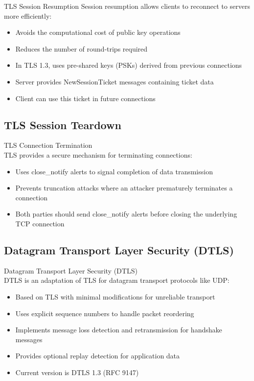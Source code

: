 \begin{definition}{TLS Session Resumption}
Session resumption allows clients to reconnect to servers more efficiently:
\begin{itemize}
    \item Avoids the computational cost of public key operations
    \item Reduces the number of round-trips required
    \item In TLS 1.3, uses pre-shared keys (PSKs) derived from previous connections
    \item Server provides NewSessionTicket messages containing ticket data
    \item Client can use this ticket in future connections
\end{itemize}
\end{definition}

\subsection{TLS Session Teardown}

\begin{concept}{TLS Connection Termination}\\
TLS provides a secure mechanism for terminating connections:
\begin{itemize}
    \item Uses close\_notify alerts to signal completion of data transmission
    \item Prevents truncation attacks where an attacker prematurely terminates a connection
    \item Both parties should send close\_notify alerts before closing the underlying TCP connection
\end{itemize}
\end{concept}

\subsection{Datagram Transport Layer Security (DTLS)}

\begin{definition}{Datagram Transport Layer Security (DTLS)}\\
DTLS is an adaptation of TLS for datagram transport protocols like UDP:
\begin{itemize}
    \item Based on TLS with minimal modifications for unreliable transport
    \item Uses explicit sequence numbers to handle packet reordering
    \item Implements message loss detection and retransmission for handshake messages
    \item Provides optional replay detection for application data
    \item Current version is DTLS 1.3 (RFC 9147)
\end{itemize}
\end{definition}




